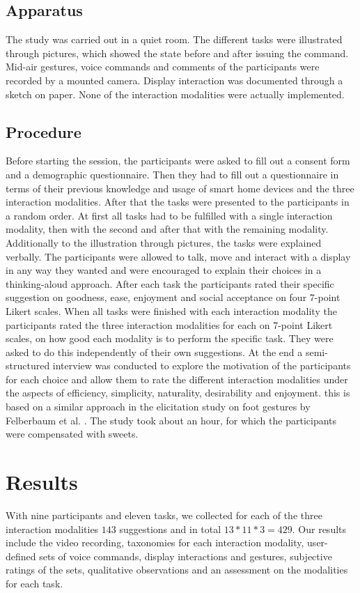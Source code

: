 \documentclass[sigchi]{acmart}
\begin{document}
\subsection{Apparatus}
The study was carried out in a quiet room. The different tasks were illustrated through pictures, which showed the state before and after issuing the command. Mid-air gestures, voice commands and comments of the participants were recorded by a mounted camera. Display interaction was documented through a sketch on paper. None of the interaction modalities were actually implemented.

\subsection{Procedure}
Before starting the session, the participants were asked to fill out a consent form and a demographic questionnaire. Then they had to fill out a questionnaire in terms of their previous knowledge and usage of smart home devices and the three interaction modalities. After that the tasks were presented to the participants in a random order. At first all tasks had to be fulfilled with a single interaction modality, then with the second and after that with the remaining modality. Additionally to the illustration through pictures, the tasks were explained verbally. The participants were allowed to talk, move and interact with a display in any way they wanted and were encouraged to explain their choices in a thinking-aloud approach. After each task the participants rated their specific suggestion on goodness, ease, enjoyment and social acceptance on four 7-point Likert scales. When all tasks were finished with each interaction modality the participants rated the three interaction modalities for each on 7-point Likert scales, on how good each modality is to perform the specific task. They were asked to do this independently of their own suggestions. At the end a semi-structured interview was conducted to explore the motivation of the participants for each choice and allow them to rate the different interaction modalities under the aspects of efficiency, simplicity, naturality, desirability and enjoyment. this is based on a similar approach in the elicitation study on foot gestures by Felberbaum et al. \cite{Felberbaum.2018}. The study took about an hour, for which the participants were compensated with sweets.

\section{Results}
With nine participants and eleven tasks, we collected for each of the three interaction modalities $143$ suggestions and in total $13*11*3=429$. Our results include the video recording, taxonomies for each interaction modality, user-defined sets of voice commands, display interactions and gestures, subjective ratings of the sets, qualitative observations and an assessment on the modalities for each task. 
\end{document}
